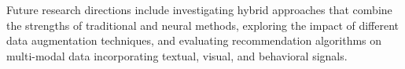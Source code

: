 \documentclass[sigconf,nonacm]{acmart} %
\begin{document}
Future research directions include investigating hybrid approaches that combine the strengths of traditional and neural methods, exploring the impact of different data augmentation techniques, and evaluating recommendation algorithms on multi-modal data incorporating textual, visual, and behavioral signals.  



\clearpage  
   
  
\end{document}
